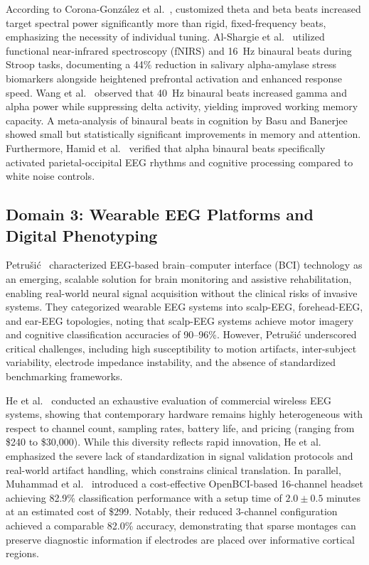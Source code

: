 \documentclass[12pt, a4paper]{report}
\begin{document}
According to Corona-González et al.~\cite{CoronaGonzalez2021}, customized theta and beta beats increased target spectral power significantly more than rigid, fixed-frequency beats, emphasizing the necessity of individual tuning. Al-Shargie et al.~\cite{AlShargie2022} utilized functional near-infrared spectroscopy (fNIRS) and 16~Hz binaural beats during Stroop tasks, documenting a 44\% reduction in salivary alpha-amylase stress biomarkers alongside heightened prefrontal activation and enhanced response speed. Wang et al.~\cite{WangZhang2022} observed that 40~Hz binaural beats increased gamma and alpha power while suppressing delta activity, yielding improved working memory capacity. A meta-analysis of binaural beats in cognition by Basu and Banerjee~\cite{BasuBanerjee2023} showed small but statistically significant improvements in memory and attention. Furthermore, Hamid et al.~\cite{Hamid2025} verified that alpha binaural beats specifically activated parietal-occipital EEG rhythms and cognitive processing compared to white noise controls.

\subsection{Domain 3: Wearable EEG Platforms and Digital Phenotyping}
\label{subsec:lit_wearable_systems}
Petru\v{s}i\'{c}~\cite{Petrusic2025} characterized EEG-based brain--computer interface (BCI) technology as an emerging, scalable solution for brain monitoring and assistive rehabilitation, enabling real-world neural signal acquisition without the clinical risks of invasive systems. They categorized wearable EEG systems into scalp-EEG, forehead-EEG, and ear-EEG topologies, noting that scalp-EEG systems achieve motor imagery and cognitive classification accuracies of 90--96\%. However, Petru\v{s}i\'{c} underscored critical challenges, including high susceptibility to motion artifacts, inter-subject variability, electrode impedance instability, and the absence of standardized benchmarking frameworks.

He et al.~\cite{He2023} conducted an exhaustive evaluation of commercial wireless EEG systems, showing that contemporary hardware remains highly heterogeneous with respect to channel count, sampling rates, battery life, and pricing (ranging from \$240 to \$30{,}000). While this diversity reflects rapid innovation, He et al. emphasized the severe lack of standardization in signal validation protocols and real-world artifact handling, which constrains clinical translation. In parallel, Muhammad et al.~\cite{Muhammad2023} introduced a cost-effective OpenBCI-based 16-channel headset achieving 82.9\% classification performance with a setup time of $2.0 \pm 0.5$ minutes at an estimated cost of \$299. Notably, their reduced 3-channel configuration achieved a comparable 82.0\% accuracy, demonstrating that sparse montages can preserve diagnostic information if electrodes are placed over informative cortical regions.
\end{document}

